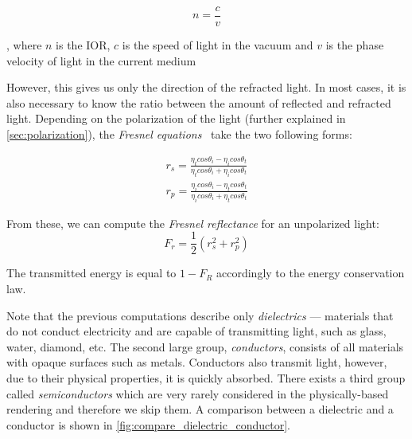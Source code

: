 \begin{equation}
n=\frac{c}{v}
\end{equation}

, where $n$ is the IOR, $c$ is the speed of light in the vacuum and $v$ is the phase velocity of light in the current medium

However, this gives us only the direction of the refracted light. In most cases, it is also necessary to know the ratio between the amount of reflected and refracted light. Depending on the polarization of the light (further explained in \autoref{sec:polarization}), the \emph{Fresnel equations}~\cite{pharr2016physically} take the two following forms:

\begin{align*}
r_s = \frac{\eta_t cos\theta_i - \eta_i cos\theta_t}{\eta_t cos\theta_i + \eta_i cos\theta_t}\\
r_p = \frac{\eta_i cos\theta_i - \eta_t cos\theta_t}{\eta_i cos\theta_i + \eta_t cos\theta_t} 
\end{align*}

From these, we can compute the \emph{Fresnel reflectance} for an unpolarized light:
\begin{equation}
F_r=\frac{1}{2}(r_s^2 + r_p^2)
\end{equation}

The transmitted energy is equal to $1-F_R$ accordingly to the energy conservation law.

Note that the previous computations describe only \emph{dielectrics} --- materials that do not conduct electricity and are capable of transmitting light, such as glass, water, diamond, etc. The second large group, \emph{conductors}, consists of all materials with opaque surfaces such as metals. Conductors also transmit light, however, due to their physical properties, it is quickly absorbed. There exists a third group called \emph{semiconductors} which are very rarely considered in the physically-based rendering and therefore we skip them. A comparison between a dielectric and a conductor is shown in \autoref{fig:compare_dielectric_conductor}.

